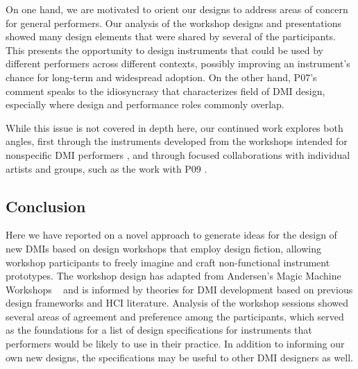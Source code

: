 \documentclass[letterpaper, 12pt]{article}
\begin{document}
On one hand, we are motivated to orient our designs to address areas of concern for general performers. Our analysis of the workshop designs and presentations showed many design elements that were shared by several of the participants. This presents the opportunity to design instruments that could be used by different performers across different contexts, possibly improving an instrument's chance for long-term and widespread adoption. On the other hand, P07's comment speaks to the idiosyncrasy that characterizes field of DMI design, especially where design and performance roles commonly overlap. 

While this issue is not covered in depth here, our continued work explores both angles, first through the instruments developed from the workshops intended for nonspecific DMI performers \citep{Sullivan2020nime}, and through focused collaborations with individual artists and groups, such as the work with P09 \citep{Sullivan2018}. 

\subsection{Conclusion}
\label{ch3-sec:conclusion}

Here we have reported on a novel approach to generate ideas for the design of new DMIs based on design workshops that employ design fiction, allowing workshop participants to freely imagine and craft non-functional instrument prototypes. The workshop design has adapted from Andersen's Magic Machine Workshops ~\citep{Andersen2017} and is informed by theories for DMI development based on previous design frameworks and HCI literature. 
Analysis of the workshop sessions showed several areas of agreement and preference among the participants, which served as the foundations for a list of design specifications for instruments that performers would be likely to use in their practice. In addition to informing our own new designs, the specifications may be useful to other DMI designers as well. 
\end{document}
